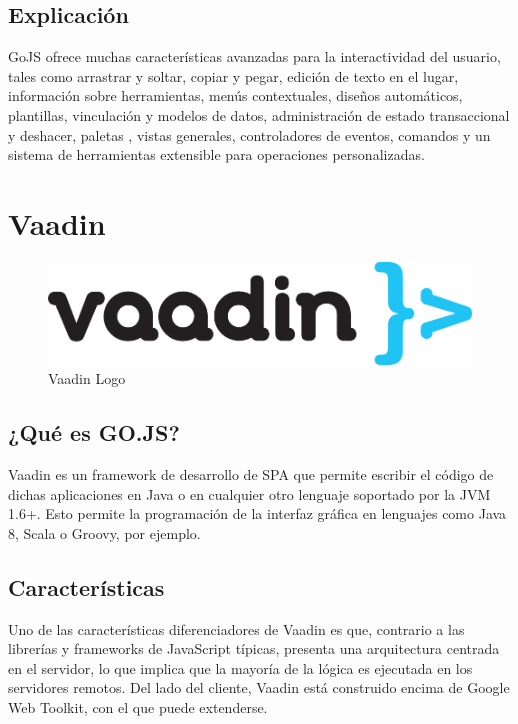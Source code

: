 \documentclass[a4paper,12pt]{book}
\begin{document}
	 	
	 		\subsection{Explicación}
	 		GoJS ofrece muchas características avanzadas para la interactividad del usuario, tales como arrastrar y soltar, copiar y pegar, edición de texto en el lugar, información sobre herramientas, menús contextuales, diseños automáticos, plantillas, vinculación y modelos de datos, administración de estado transaccional y deshacer, paletas , vistas generales, controladores de eventos, comandos y un sistema de herramientas extensible para operaciones personalizadas.
	 
	 
	 	\section{Vaadin}
	 	
	 		\begin{figure}[h]
	 			\centering
	 			\includegraphics[scale=1]{Vaadin-logo.png}
	 			\caption{Vaadin Logo}\label{fig:Vaadin-logo}
	 		\end{figure}
 		
 			\subsection{¿Qué es GO.JS?}
 				Vaadin\cite{vaadin} es un framework de desarrollo de SPA que permite escribir el código de dichas aplicaciones en Java o en cualquier otro lenguaje soportado por la JVM 1.6+. Esto permite la programación de la interfaz gráfica en lenguajes como Java 8, Scala o Groovy, por ejemplo.
 			
 			\subsection{Características}
 				Uno de las características diferenciadores de Vaadin es que, contrario a las librerías y frameworks de JavaScript típicas, presenta una arquitectura centrada en el servidor, lo que implica que la mayoría de la lógica es ejecutada en los servidores remotos. Del lado del cliente, Vaadin está construido encima de Google Web Toolkit, con el que puede extenderse.
 	
\end{document}
